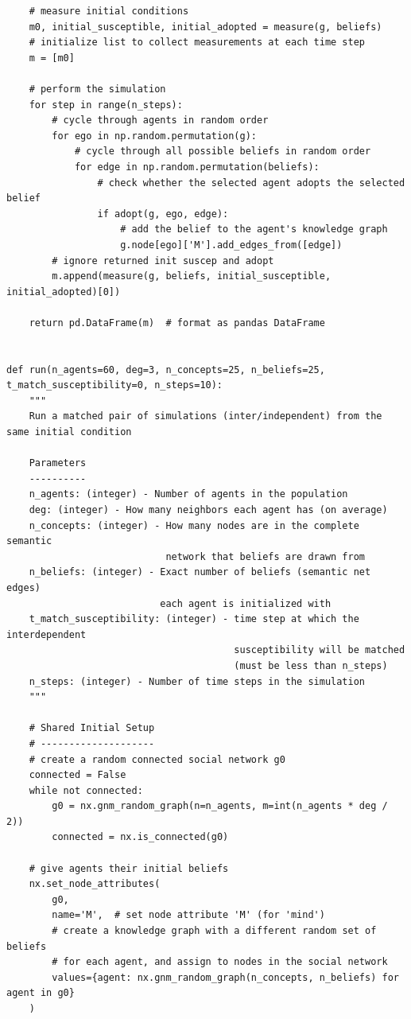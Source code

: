 \documentclass{article}
\begin{document}
\begin{verbatim}
    # measure initial conditions
    m0, initial_susceptible, initial_adopted = measure(g, beliefs)  
    # initialize list to collect measurements at each time step
    m = [m0]  

    # perform the simulation
    for step in range(n_steps):  
        # cycle through agents in random order
        for ego in np.random.permutation(g):  
            # cycle through all possible beliefs in random order
            for edge in np.random.permutation(beliefs):  
                # check whether the selected agent adopts the selected belief
                if adopt(g, ego, edge):  
                    # add the belief to the agent's knowledge graph
                    g.node[ego]['M'].add_edges_from([edge])  
        # ignore returned init suscep and adopt            
        m.append(measure(g, beliefs, initial_susceptible, initial_adopted)[0])  

    return pd.DataFrame(m)  # format as pandas DataFrame


def run(n_agents=60, deg=3, n_concepts=25, n_beliefs=25, t_match_susceptibility=0, n_steps=10):
    """
    Run a matched pair of simulations (inter/independent) from the same initial condition

    Parameters
    ----------
    n_agents: (integer) - Number of agents in the population
    deg: (integer) - How many neighbors each agent has (on average)
    n_concepts: (integer) - How many nodes are in the complete semantic 
                            network that beliefs are drawn from
    n_beliefs: (integer) - Exact number of beliefs (semantic net edges) 
                           each agent is initialized with
    t_match_susceptibility: (integer) - time step at which the interdependent 
                                        susceptibility will be matched
                                        (must be less than n_steps)
    n_steps: (integer) - Number of time steps in the simulation
    """

    # Shared Initial Setup
    # --------------------
    # create a random connected social network g0
    connected = False
    while not connected:
        g0 = nx.gnm_random_graph(n=n_agents, m=int(n_agents * deg / 2))
        connected = nx.is_connected(g0)

    # give agents their initial beliefs
    nx.set_node_attributes(
        g0,
        name='M',  # set node attribute 'M' (for 'mind')
        # create a knowledge graph with a different random set of beliefs
        # for each agent, and assign to nodes in the social network
        values={agent: nx.gnm_random_graph(n_concepts, n_beliefs) for agent in g0}
    )


\end{verbatim}
\end{document}
